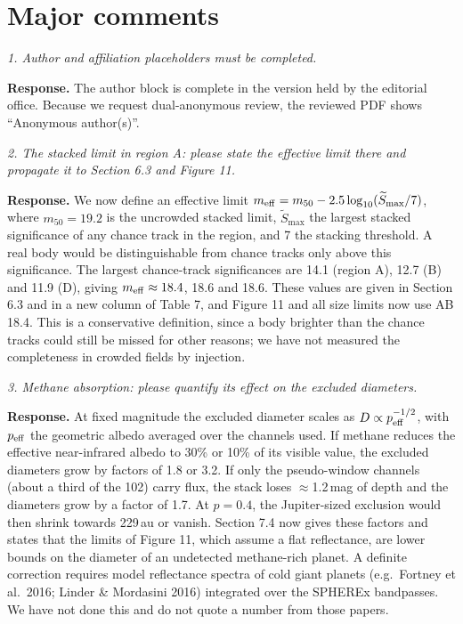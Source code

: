 \documentclass[11pt]{article}
\newenvironment{referee}{\par\color{black!60}\itshape}{\par}
\newcommand{\resp}{\par\noindent\textbf{Response.} }
\begin{document}
\section*{Major comments}

\begin{referee}
1. Author and affiliation placeholders must be completed.
\end{referee}
\resp The author block is complete in the version held by the editorial office. Because we request dual-anonymous review, the reviewed PDF shows ``Anonymous author(s)''.

\begin{referee}
2. The stacked limit in region A: please state the effective limit there and propagate it to Section 6.3 and Figure 11.
\end{referee}
\resp We now define an effective limit $m_{\rm eff} = m_{50} - 2.5\log_{10}(\widetilde{S}_{\max}/7)$, where $m_{50} = 19.2$ is the uncrowded stacked limit, $\widetilde{S}_{\max}$ the largest stacked significance of any chance track in the region, and 7 the stacking threshold. A real body would be distinguishable from chance tracks only above this significance. The largest chance-track significances are 14.1 (region A), 12.7 (B) and 11.9 (D), giving $m_{\rm eff} \approx 18.4$, 18.6 and 18.6. These values are given in Section 6.3 and in a new column of Table 7, and Figure 11 and all size limits now use AB 18.4. This is a conservative definition, since a body brighter than the chance tracks could still be missed for other reasons; we have not measured the completeness in crowded fields by injection.

\begin{referee}
3. Methane absorption: please quantify its effect on the excluded diameters.
\end{referee}
\resp At fixed magnitude the excluded diameter scales as $D \propto p_{\rm eff}^{-1/2}$, with $p_{\rm eff}$ the geometric albedo averaged over the channels used. If methane reduces the effective near-infrared albedo to 30\% or 10\% of its visible value, the excluded diameters grow by factors of 1.8 or 3.2. If only the pseudo-window channels (about a third of the 102) carry flux, the stack loses $\approx$1.2\,mag of depth and the diameters grow by a factor of 1.7. At $p = 0.4$, the Jupiter-sized exclusion would then shrink towards 229\,au or vanish. Section 7.4 now gives these factors and states that the limits of Figure 11, which assume a flat reflectance, are lower bounds on the diameter of an undetected methane-rich planet. A definite correction requires model reflectance spectra of cold giant planets (e.g.\ Fortney et al.\ 2016; Linder \& Mordasini 2016) integrated over the SPHEREx bandpasses. We have not done this and do not quote a number from those papers.
\end{document}
